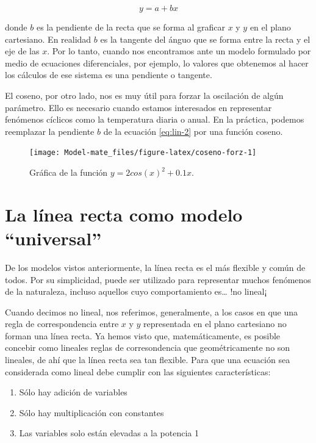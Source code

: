 \documentclass[
]{book}
\providecommand{\tightlist}{%
  \setlength{\itemsep}{0pt}\setlength{\parskip}{0pt}}
\begin{document}
\begin{equation}
    y = a + bx \label{eq:lin-2}
\end{equation}

donde \(b\) es la pendiente de la recta que se forma al graficar \(x\) y \(y\) en el plano cartesiano. En realidad \(b\) es la tangente del ánguo que se forma entre la recta y el eje de las \(x\). Por lo tanto, cuando nos encontramos ante un modelo formulado por medio de ecuaciones diferenciales, por ejemplo, lo valores que obtenemos al hacer los cálculos de ese sistema es una pendiente o tangente.

El coseno, por otro lado, nos es muy útil para forzar la oscilación de algún parámetro. Ello es necesario cuando estamos interesados en representar fenómenos cíclicos como la temperatura diaria o anual. En la práctica, podemos reemplazar la pendiente \(b\) de la ecuación \eqref{eq:lin-2} por una función coseno.

\begin{figure}

{\centering \texttt{[image: Model-mate\_files/figure-latex/coseno-forz-1]} 

}

\caption{Gráfica de la función $y = 2 cos(x)^2 + 0.1  x$.}\label{fig:coseno-forz}
\end{figure}

\hypertarget{la-luxednea-recta-como-modelo-universal}{%
\section{La línea recta como modelo ``universal''}\label{la-luxednea-recta-como-modelo-universal}}

De los modelos vistos anteriormente, la línea recta es el más flexible y común de todos. Por su simplicidad, puede ser utilizado para representar muchos fenómenos de la naturaleza, incluso aquellos cuyo comportamiento es\ldots{} !no lineal¡

Cuando decimos no lineal, nos referimos, generalmente, a los casos en que una regla de correspondencia entre \(x\) y \(y\) representada en el plano cartesiano no forman una línea recta. Ya hemos visto que, matemáticamente, es posible concebir como lineales reglas de corresondencia que geométricamente no son lineales, de ahí que la línea recta sea tan flexible. Para que una ecuación sea considerada como lineal debe cumplir con las siguientes características:

\begin{enumerate}
\def\labelenumi{\arabic{enumi}.}
\tightlist
\item
  Sólo hay adición de variables
\item
  Sólo hay multiplicación con constantes
\item
  Las variables solo están elevadas a la potencia 1
\end{enumerate}
\end{document}
